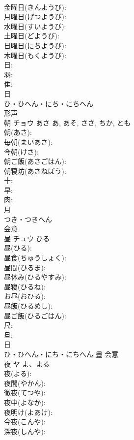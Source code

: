 \documentclass[8pt]{extreport}
\begin{document}
\begin{CJK}{UTF8}{min}
\\	金曜日(きんようび): 
\\	月曜日(げつようび): 
\\	水曜日(すいようび): 
\\	土曜日(どようび): 
\\	日曜日(にちようび): 
\\	木曜日(もくようび): 
\\	日: 
\\	羽: 
\\	隹: 
\\	日	
\\	ひ・ひへん・にち・にちへん	
\\	形声 
\\	朝	チョウ	あさ	あ, あそ, ささ, ちか, とも	
\\	朝(あさ): 
\\	毎朝(まいあさ): 
\\	今朝(けさ): 
\\	朝ご飯(あさごはん): 
\\	朝寝坊(あさねぼう): 
\\	十: 
\\	早: 
\\	肉: 
\\	月	
\\	つき・つきへん	
\\	会意 
\\	昼	チュウ	ひる		
\\	昼(ひる): 
\\	昼食(ちゅうしょく): 
\\	昼間(ひるま): 
\\	昼休み(ひるやすみ): 
\\	昼寝(ひるね): 
\\	お昼(おひる): 
\\	昼飯(ひるめし): 
\\	昼ご飯(ひるごはん): 
\\	尺: 
\\	旦: 
\\	日	
\\	ひ・ひへん・にち・にちへん	晝	会意 
\\	夜	ヤ	よ、よる		
\\	夜(よる): 
\\	夜間(やかん): 
\\	徹夜(てつや): 
\\	夜中(よなか): 
\\	夜明け(よあけ): 
\\	今夜(こんや): 
\\	深夜(しんや): 

\end{CJK}
\end{document}
